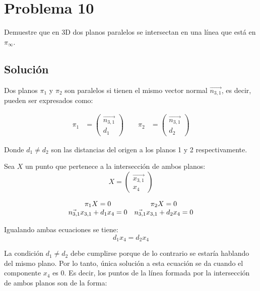 \section*{Problema 10}
\setcounter{equation}{0}
Demuestre que en 3D dos planos paralelos se intersectan en una línea que está en $\pi_\infty$.

\subsection*{Solución}
Dos planos $\pi_1$ y $\pi_2$ son paralelos si tienen el mismo vector normal $\vec{n_{3,1}}$, 
es decir, pueden ser expresados como:

\begin{equation}
\begin{aligned}
\pi_1 &= \left(
\begin{array}{c}
  \vec{n_{3,1}} \\ 
  d_1
\end{array}
\right) 
\qquad
\pi_2 &= \left(
\begin{array}{c}
  \vec{n_{3,1}} \\ 
  d_2
\end{array}
\right) 
\end{aligned} 
\end{equation}

Donde $d_1 \neq d_2$ son las distancias del origen a los planos 1 y 2 respectivamente.


Sea $X$ un punto que pertenece a la intersección de ambos planos:
\begin{equation*}
X = 
\left(
\begin{array}{c}
  \vec{x_{3,1}} \\ 
  x_4
\end{array}
\right) 
\end{equation*} 

\begin{equation*}
\begin{array}{c c}
\pi_1 X = 0
&
\pi_2 X = 0 \\
\vec{n_{3,1}} x_{3,1} + d_1 x_4 = 0 
&
\vec{n_{3,1}} x_{3,1} + d_2 x_4 = 0\\ 
\end{array} 
\end{equation*} 

Igualando ambas ecuaciones se tiene:
\begin{equation*}
d_1 x_4 = d_2 x_4
\end{equation*} 

La condición $d_1 \neq d_2$ debe cumplirse porque de lo contrario se estaría hablando 
del mismo plano. Por lo tanto, única solución a esta ecuación se da
cuando el componente $x_4$ es 0. Es decir, los puntos de la línea 
formada por la intersección de ambos planos son de la forma:

